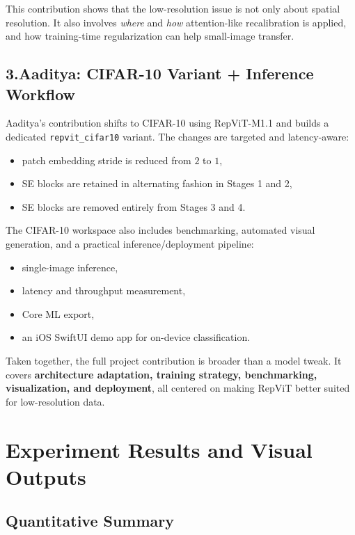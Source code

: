 \documentclass[10pt,a4paper,twocolumn]{article}
\begin{document}
This contribution shows that the low-resolution issue is not only about spatial resolution. It also involves \emph{where} and \emph{how} attention-like recalibration is applied, and how training-time regularization can help small-image transfer.

\subsection*{3.Aaditya: CIFAR-10 Variant + Inference Workflow}

Aaditya's contribution shifts to CIFAR-10 using RepViT-M1.1 and builds a dedicated \texttt{repvit\_cifar10} variant. The changes are targeted and latency-aware:
\begin{itemize}[leftmargin=1.2em]
    \item patch embedding stride is reduced from \(2\) to \(1\),
    \item SE blocks are retained in alternating fashion in Stages 1 and 2,
    \item SE blocks are removed entirely from Stages 3 and 4.
\end{itemize}

The CIFAR-10 workspace also includes benchmarking, automated visual generation, and a practical inference/deployment pipeline:
\begin{itemize}[leftmargin=1.2em]
    \item single-image inference,
    \item latency and throughput measurement,
    \item Core ML export,
    \item an iOS SwiftUI demo app for on-device classification.
\end{itemize}

Taken together, the full project contribution is broader than a model tweak. It covers \textbf{architecture adaptation, training strategy, benchmarking, visualization, and deployment}, all centered on making RepViT better suited for low-resolution data.

\section{Experiment Results and Visual Outputs}

\subsection*{Quantitative Summary}
\end{document}
